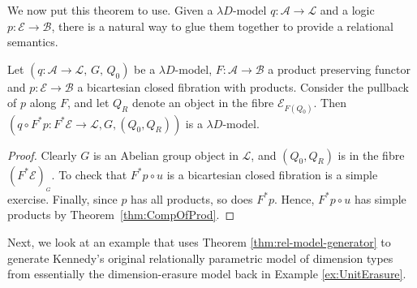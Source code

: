 \documentclass[a4paper,UKenglish]{lipics}
\theoremstyle{plain}
\newcommand{\A}{\mathcal{A}}
\newcommand{\B}{\mathcal{B}}
\newcommand{\E}{\mathcal{E}}
\newcommand{\fibre}[2]{#1_{_{#2}}}
\newcommand{\fibreE}[1]{\E_{#1}}
\begin{document}
\noindent
\begin{minipage}[l]{0.74\linewidth}
We now put this theorem to use. Given a $\lambda D$-model $q : \A \rightarrow \mathcal{L}$ and a logic $p: \E \rightarrow \B$, there is a natural way to glue them together to provide a relational semantics.

\begin{theorem}
\label{thm:rel-model-generator}
Let $(q:\A \rightarrow \mathcal{L}, \, G,\, Q_0)$ be a $\lambda D$-model, $F:\A \rightarrow \B$ a product preserving functor and $p: \E \rightarrow \B$ a bicartesian closed fibration with products. Consider the pullback of $p$ along $F$, and let $Q_R$ denote an object in the fibre $\fibreE{F(Q_0)}$.
Then $(q \circ F^\ast p :F^{\ast} \E \rightarrow \mathcal{L}, G,(Q_0,Q_R))$  is a $\lambda D$-model.
\end{theorem}

 \end{minipage}
\begin{minipage}{0.25\textwidth}
\scalebox{0.9}{
\begin{diagram}
 F^\ast (\E)	\SEpbk	&\rTo		&\E \\
  \dTo<{F^\ast p}	&		&\dTo>{p}\\
  \A			&\rTo_{F}	&\B\\
  \dTo<{q}      	&		&\\
  \mathcal{L}		&       	&
 \end{diagram}
}
 \end{minipage}



\begin{proof}
Clearly $G$ is an Abelian group object in $\mathcal{L}$, and $(Q_0, Q_R)$ is in the fibre $\fibre{(F^\ast \E)}{G}$. To check that $F^\ast p \circ u$ is a bicartesian closed fibration is a simple exercise. Finally, since $p$ has all products, so does $F^\ast p$. Hence, $F^\ast p \circ u$ has simple products by Theorem~\ref{thm:CompOfProd}.
\end{proof}

Next, we look at an example that uses Theorem \ref{thm:rel-model-generator} to generate Kennedy's original relationally parametric model of dimension types \cite{Kennedy:1997:RPU:263699.263761} from essentially the dimension-erasure model back in Example \ref{ex:UnitErasure}.
\end{document}
